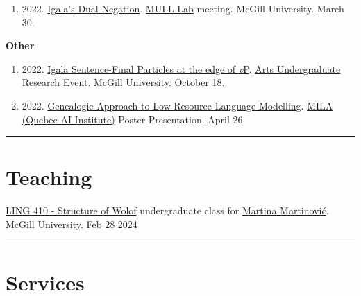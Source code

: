 \documentclass[margin,line]{resume}
\begin{document}
\begin{resume}
\begin{enumerate}[-, leftmargin=1em, topsep=4pt]
		\item[] {2022. \href{https://mcling.blogs.mcgill.ca/2022/03/27/mull-lab-03-30-brandon-chaperon/}{Igala's Dual Negation}. \href{https://mull-lab.org/}{MULL Lab} meeting. McGill University. March 30.}
	\end{enumerate}

	\textbf{Other}
	\begin{enumerate}[-, leftmargin=1em, topsep=4pt]
		\item[] {2022. \href{https://www.mcgill.ca/arts-internships/files/arts-internships/brandon_chaperon.pdf}{Igala Sentence-Final Particles at the edge of \textit{v}P}. \href{https://www.mcgill.ca/arts-internships/events-0/#block-bean-annual-faculty-of-arts-undergrad}{Arts Undergraduate Research Event}. McGill University. October 18.}

		\item[] {2022. \href{https://github.com/dopestdope123/LING484-Final-Projects}{Genealogic Approach to Low-Resource Language Modelling}. \href{https://mila.quebec/en/}{MILA (Quebec AI Institute)} Poster Presentation. April 26.}

	\end{enumerate}


	\vspace{-0.6em}\rule{\textwidth}{0.4pt}


	\section{\mysidestyle Teaching}

	\href{https://www.mcgill.ca/study/2023-2024/courses/ling-410}{LING 410 - Structure of Wolof} undergraduate class for \href{https://inamartinovic.com/}{Martina Martinović}.\\
	McGill University.
	\hfill Feb 28 2024
	\begin{comment}
	\begin{enumerate}[-, leftmargin=1em, topsep=4pt]
		\item[]
	\end{enumerate}
	\end{comment}

	\vspace{-0.6em}\rule{\textwidth}{0.4pt}


	\section{\mysidestyle Services}


\end{resume}
\end{document}
